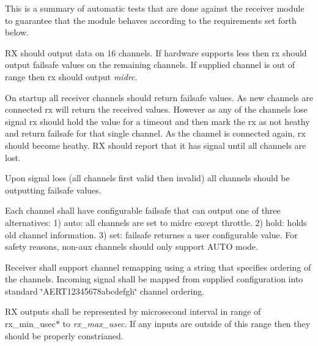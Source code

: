 This is a summary of automatic tests that are done against the receiver module to guarantee that the module behaves according to the requirements set forth below.


\begin{DoxyItemize}
\item R\+X should output data on 16 channels. If hardware supports less then rx should output failsafe values on the remaining channels. If supplied channel is out of range then rx should output {\itshape midrc}.
\item On startup all receiver channels should return failsafe values. As new channels are connected rx will return the received values. However as any of the channels lose signal rx should hold the value for a timeout and then mark the rx as not heathy and return failsafe for that single channel. As the channel is connected again, rx should become heathy. R\+X should report that it has signal until all channels are lost.
\item Upon signal loss (all channels first valid then invalid) all channels should be outputting failsafe values.
\item Each channel shall have configurable failsafe that can output one of three alternatives\+: 1) auto\+: all channels are set to midrc except throttle. 2) hold\+: holds old channel information. 3) set\+: failsafe returnes a user configurable value. For safety reasons, non-\/aux channels should only support A\+U\+T\+O mode.
\item Receiver shall support channel remapping using a string that specifies ordering of the channels. Incoming signal shall be mapped from supplied configuration into standard \char`\"{}\+A\+E\+R\+T12345678abcdefgh\char`\"{} channel ordering.
\item R\+X outputs shall be represented by microsecond interval in range of rx\+\_\+min\+\_\+usec$\ast$ to {\itshape rx\+\_\+max\+\_\+usec}. If any inputs are outside of this range then they should be properly constrianed. 
\end{DoxyItemize}